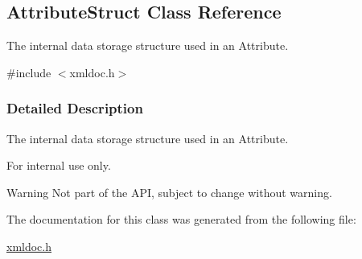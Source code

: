 \hypertarget{classAttributeStruct}{
\subsection{AttributeStruct Class Reference}
\label{d6/d23/classAttributeStruct}
}


The internal data storage structure used in an Attribute.  




{\ttfamily \#include $<$xmldoc.h$>$}



\subsubsection{Detailed Description}
The internal data storage structure used in an Attribute. \begin{DoxyInternal}{For internal use only.}
\begin{DoxyWarning}{Warning}
Not part of the API, subject to change without warning. 
\end{DoxyWarning}
\end{DoxyInternal}


The documentation for this class was generated from the following file:\begin{DoxyCompactItemize}
\item 
\hyperlink{xmldoc_8h}{xmldoc.h}\end{DoxyCompactItemize}
